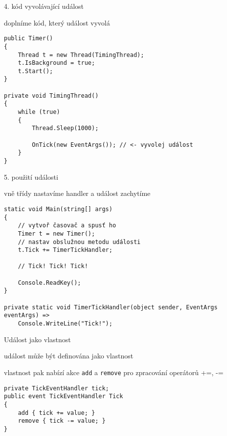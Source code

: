 \begin{frame}[fragile]
\vfill
\begin{bitemize}{4. kód vyvolávající událost}
\item doplníme kód, který událost vyvolá
\end{bitemize}
\vfill
\begin{yesblock}
\begin{lstlisting}
public Timer()
{
    Thread t = new Thread(TimingThread);
    t.IsBackground = true;
    t.Start();
}

private void TimingThread()
{
    while (true)
    {
        Thread.Sleep(1000);

        OnTick(new EventArgs()); // <- vyvolej událost
    }
}
\end{lstlisting}
\end{yesblock}
\vfill
\end{frame}




\begin{frame}[fragile]
\vfill
\begin{bitemize}{5. použití události}
\item vně třídy nastavíme handler a událost zachytíme
\end{bitemize}
\vfill
\begin{yesblock}
\begin{lstlisting}
static void Main(string[] args)
{
	// vytvoř časovač a spusť ho
    Timer t = new Timer();
    // nastav obslužnou metodu události
    t.Tick += TimerTickHandler;

    // Tick! Tick! Tick!

    Console.ReadKey();
}

private static void TimerTickHandler(object sender, EventArgs eventArgs) =>
    Console.WriteLine("Tick!");
\end{lstlisting}
\end{yesblock}
\vfill
\end{frame}





\begin{frame}[fragile]
\vfill
\begin{bitemize}{Událost jako vlastnost}
\item událost může být definována jako vlastnost
\item vlastnost pak nabízí akce \lstinline|add| a \lstinline|remove| pro zpracování operátorů +=, -=
\end{bitemize}
\vfill
\begin{yesblock}
\begin{lstlisting}[morekeywords={add,remove,value}]
private TickEventHandler tick;
public event TickEventHandler Tick
{
    add { tick += value; }
    remove { tick -= value; }
}
\end{lstlisting}
\end{yesblock}
\vfill
\end{frame}
